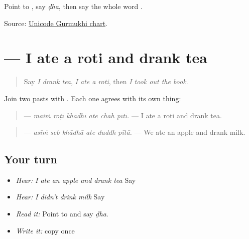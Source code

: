 \begin{tcolorbox}[breakable,colback=teal!4,colframe=teal!35!black,title={Before you move on}]
Point to \textbf{}, say \emph{ḍha}, then say the whole word \textbf{}.

Source: \href{https://www.unicode.org/charts/PDF/U0A00.pdf}{Unicode Gurmukhi chart}.
\end{tcolorbox}
\section[\texorpdfstring{\pa{ਮੈਂ} \pa{ਰੋਟੀ} \pa{ਖਾਧੀ} \pa{ਅਤੇ} … (maiṁ roṭī khādhī …)}{ਮੈਂ ਰੋਟੀ ਖਾਧੀ ਅਤੇ … (maiṁ roṭī khādhī …)}]{      — I ate a roti and drank tea}

\label{lesson:PA-C219-what-i-had}



\begin{quote}
Say \emph{I drank tea}, \emph{I ate a roti}, then \emph{I took out the book}.
\end{quote}

\begin{grammarlens}[title={Grammar Lens: two things, two endings}]
Join two pasts with \textbf{}. Each one agrees with its own thing:

\begin{quote}
\textbf{     } — \emph{maiṁ roṭī khādhī ate chāh pītī.} — I ate a roti and drank tea.
\end{quote}

\begin{quote}
\textbf{     } — \emph{asīṁ seb khādhā ate duddh pītā.} — We ate an apple and drank milk.
\end{quote}
\end{grammarlens}

\subsection*{Your turn}
\begin{itemize}
\raggedright
  \item \emph{Hear:} \emph{I ate an apple and drank tea} Say \textbf{     }
  \item \emph{Hear:} \emph{I didn't drink milk} Say \textbf{   }
  \item \emph{Read it:} \textbf{} Point to \textbf{} and say \emph{ḍha}.
  \item \emph{Write it:} copy \textbf{     } once
\end{itemize}

